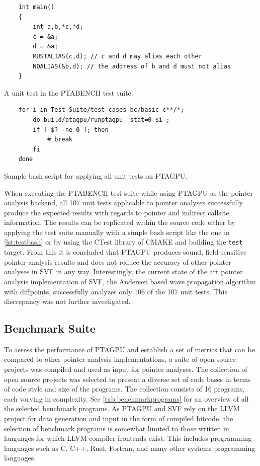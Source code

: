 \begin{listing}
    \begin{verbatim}
    int main()
    {
        int a,b,*c,*d;
        c = &a;
        d = &a;
        MUSTALIAS(c,d); // c and d may alias each other
        NOALIAS(&b,d); // the address of b and d must not alias
    }
        \end{verbatim}
    \caption{A unit test in the PTABENCH test suite.}
    \label{lst:testcase}
\end{listing}

\begin{listing}
    \begin{verbatim}
    for i in Test-Suite/test_cases_bc/basic_c**/*; 
        do build/ptagpu/runptagpu -stat=0 $i ; 
        if [ $? -ne 0 ]; then
            # break
        fi
    done
    \end{verbatim}
    \caption{Sample bash script for applying all unit tests on PTAGPU.}
    \label{lst:testbash}
\end{listing}

When executing the PTABENCH test suite while using PTAGPU as the pointer analysis backend, all 107 unit tests applicable to pointer analyses successfully produce the expected results with regards to pointer and indirect callsite information.
The results can be replicated within the source code either by applying the test suite manually with a simple bash script like the one in \autoref{lst:testbash} or by using the CTest library of CMAKE and building the \verb|test| target.
From this it is concluded that PTAGPU produces sound, field-sensitive pointer analysis results and does not reduce the accuracy of other pointer analyses in SVF in any way.
Interestingly, the current state of the art pointer analysis implementation of SVF, the Andersen based wave propagation algorithm with diffpoints, successfully analyzes only 106 of the 107 unit tests.
This discrepancy was not further investigated.

\subsection{Benchmark Suite}
To assess the performance of PTAGPU and establish a set of metrics that can be compared to other pointer analysis implementations, a suite of open source projects was compiled and used as input for pointer analyses.
The collection of open source projects was selected to present a diverse set of code bases in terms of code style and size of the programs.
The collection consists of 16 programs, each varying in complexity. See \autoref{tab:benchmarkprograms} for an overview of all the selected benchmark programs.
As PTAGPU and SVF rely on the LLVM project for data generation and input in the form of compiled bitcode, the selection of benchmark programs is somewhat limited to those written in languages for which LLVM compiler frontends exist. This includes programming languages such as C, C++, Rust, Fortran, and many other systems programming languages.


